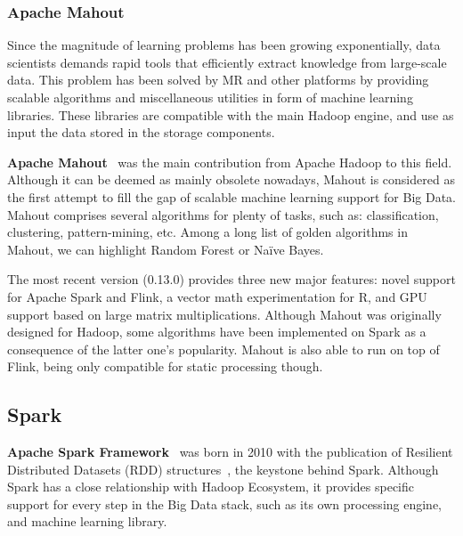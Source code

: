 \documentclass[3p,review]{elsarticle}
\begin{document}
	\subsubsection{Apache Mahout}
	
	Since the magnitude of learning problems has been growing exponentially, data scientists demands rapid tools that efficiently extract knowledge from large-scale data. This problem has been solved by MR and other platforms by providing scalable algorithms and miscellaneous utilities in form of machine learning libraries. These libraries are compatible with the main Hadoop engine, and use as input the data stored in the storage components. 
	
	\textbf{Apache Mahout}~\cite{mahout} was the main contribution from Apache Hadoop to this field. Although it can be deemed as mainly obsolete nowadays, Mahout is considered as the first attempt to fill the gap of scalable machine learning support for Big Data. Mahout comprises several algorithms for plenty of tasks, such as: classification, clustering, pattern-mining, etc. Among a long list of golden algorithms in Mahout, we can highlight Random Forest or Na\"ive Bayes. 
	
	The most recent version (0.13.0) provides three new major features: novel support for Apache Spark and Flink, a vector math experimentation for R, and GPU support based on large matrix multiplications. Although Mahout was originally designed for Hadoop, some algorithms have been implemented on Spark as a consequence of the latter one's popularity. Mahout is also able to run on top of Flink, being only compatible for static processing though.
	
	\subsection{Spark}\label{subsec:spark}
	
	
	
	\textbf{Apache Spark Framework}~\cite{spark} was born in 2010 with the publication of Resilient Distributed Datasets (RDD) structures~\cite{zaharia12}, the keystone behind Spark. Although Spark has a close relationship with Hadoop Ecosystem, it provides specific support for every step in the Big Data stack, such as its own processing engine, and machine learning library. 
	
\end{document}
